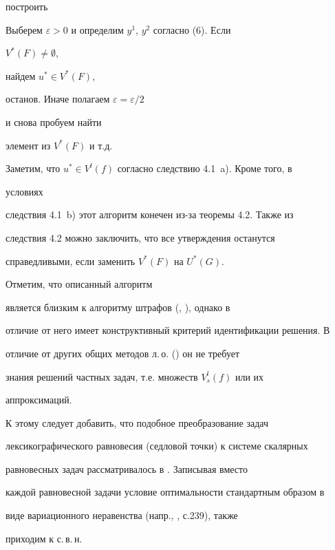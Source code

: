 построить





\begin{algs}


Выберем $\varepsilon>0$ и определим $y^1$, $y^2$ согласно (6). Если


$V^*(F)\ne\emptyset$,


найдем $u^*\in V^*(F)$,


останов. Иначе полагаем $\varepsilon=\varepsilon/2$


и снова пробуем найти


элемент из $V^*(F)$ и т.д.


\end{algs}





Заметим, что $u^*\in V^l(f)$ согласно следствию 4.1~a). Кроме того, в


условиях


следствия 4.1~b) этот алгоритм конечен из-за теоремы 4.2. Также из


следствия 4.2 можно заключить, что все утверждения останутся


справедливыми, если заменить $V^*(F)$ на $U^*(G)$.


Отметим, что описанный алгоритм


является близким к алгоритму штрафов (\cite{Kal}, \cite{Fed}), однако в


отличие от него имеет конструктивный критерий идентификации решения. В


отличие от других общих методов л.\,о. (\cite{Pod1}) он не требует


знания решений частных задач, т.е. множеств $V^l_s(f)$ или их


аппроксимаций.





К этому следует добавить, что подобное преобразование задач


лексикографического равновесия (седловой точки) к системе скалярных


равновесных задач рассматривалось в \cite{Kon2}. Записывая вместо


каждой равновесной задачи условие оптимальности стандартным образом в


виде вариационного неравенства (напр., \cite{Gol}, с.239), также


приходим к с.\,в.\,н.





